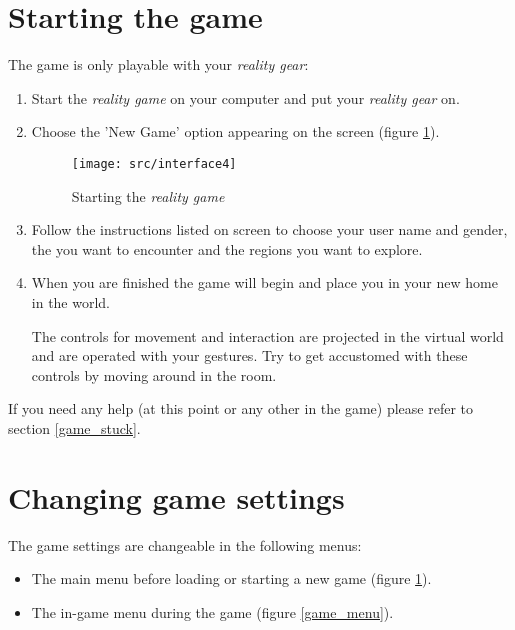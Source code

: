 
\section{Starting the game}
\label{gameStart}

The game is only playable with your \emph{\poke{} reality gear}:
\begin{enumerate}
\item Start the \emph{\poke{} reality game} on your computer and put your \emph{\poke{} reality gear} on.
\item Choose the 'New Game' option appearing on the screen (figure \ref{game_start}).
\begin{figure}[!ht]
\begin{center}
\texttt{[image: src/interface4]}
\end{center}
\caption[Starting the \emph{\pokeT{} reality game}]{Starting the \emph{\poke{} reality game}}
\label{game_start}
\end{figure}
\item Follow the instructions listed on screen to choose your user name and gender, the \poke{} you want to encounter and the regions you want to explore.
\item When you are finished the game will begin and place you in your new home in the \poke{} world. 

The controls for movement and interaction are projected in the virtual world and are operated with your gestures. Try to get accustomed with these controls by moving around in the room. 
\end{enumerate}
If you need any help (at this point or any other in the game) please refer to section \ref{game_stuck}.

\section{Changing game settings}
\label{gameSettings}
The game settings are changeable in the following menus:
\begin{itemize}
\item The main menu before loading or starting a new game (figure \ref{game_start}).
\item The in-game menu during the game (figure \ref{game_menu}).
\end{itemize}

